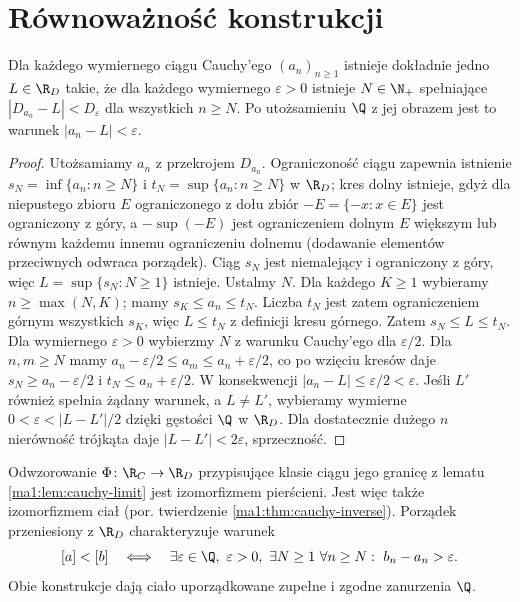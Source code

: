 \section{Równoważność konstrukcji}
\label{ma1:sec:real-equivalence}
\begin{lemat}
\label{ma1:lem:cauchy-limit}
Dla każdego wymiernego ciągu Cauchy'ego $(a_n)_{n\ge1}$ istnieje dokładnie jedno $L\in\R_D$ takie, że dla każdego wymiernego $\varepsilon>0$ istnieje $N\in\N_+$ spełniające $|D_{a_n}-L|<D_\varepsilon$ dla wszystkich $n\ge N$. Po utożsamieniu $\Q$ z jej obrazem jest to warunek $|a_n-L|<\varepsilon$.
\end{lemat}
\begin{proof}
Utożsamiamy $a_n$ z przekrojem $D_{a_n}$. Ograniczoność ciągu zapewnia istnienie $s_N=\inf\{a_n:n\ge N\}$ i $t_N=\sup\{a_n:n\ge N\}$ w $\R_D$; kres dolny istnieje, gdyż dla niepustego zbioru $E$ ograniczonego z dołu zbiór $-E=\{-x:x\in E\}$ jest ograniczony z góry, a $-\sup(-E)$ jest ograniczeniem dolnym $E$ większym lub równym każdemu innemu ograniczeniu dolnemu (dodawanie elementów przeciwnych odwraca porządek). Ciąg $s_N$ jest niemalejący i ograniczony z góry, więc $L=\sup\{s_N:N\ge1\}$ istnieje. Ustalmy $N$. Dla każdego $K\ge1$ wybieramy $n\ge\max(N,K)$; mamy $s_K\le a_n\le t_N$. Liczba $t_N$ jest zatem ograniczeniem górnym wszystkich $s_K$, więc $L\le t_N$ z definicji kresu górnego. Zatem $s_N\le L\le t_N$.
Dla wymiernego $\varepsilon>0$ wybierzmy $N$ z warunku Cauchy'ego dla $\varepsilon/2$. Dla $n,m\ge N$ mamy $a_n-\varepsilon/2\le a_m\le a_n+\varepsilon/2$, co po wzięciu kresów daje $s_N\ge a_n-\varepsilon/2$ i $t_N\le a_n+\varepsilon/2$. W konsekwencji $|a_n-L|\le\varepsilon/2<\varepsilon$.
Jeśli $L'$ również spełnia żądany warunek, a $L\ne L'$, wybieramy wymierne $0<\varepsilon<|L-L'|/2$ dzięki gęstości $\Q$ w $\R_D$. Dla dostatecznie dużego $n$ nierówność trójkąta daje $|L-L'|<2\varepsilon$, sprzeczność.
\end{proof}
\begin{twierdzenie}
\label{ma1:thm:real-isomorphism}
Odwzorowanie $\Phi\colon\R_C\to\R_D$ przypisujące klasie ciągu jego granicę z lematu \ref{ma1:lem:cauchy-limit} jest izomorfizmem pierścieni. Jest więc także izomorfizmem ciał (por. twierdzenie \ref{ma1:thm:cauchy-inverse}). Porządek przeniesiony z $\R_D$ charakteryzuje warunek
\[
 [a]<[b]\quad\Longleftrightarrow\quad
 \exists\varepsilon\in\Q,\ \varepsilon>0,\ \exists N\ge1\
 \forall n\ge N:\ b_n-a_n>\varepsilon .
\]
Obie konstrukcje dają ciało uporządkowane zupełne i zgodne zanurzenia $\Q$.
\end{twierdzenie}
